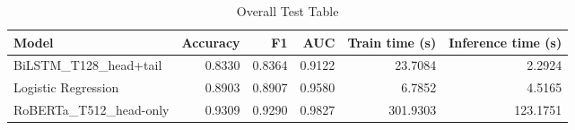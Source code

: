 \begin{table}
\caption{Overall Test Table}
\label{tab:overall_test_table}
\begin{tabular}{lrrrrr}
\toprule
Model & Accuracy & F1 & AUC & Train time (s) & Inference time (s) \\
\midrule
BiLSTM_T128_head+tail & 0.8330 & 0.8364 & 0.9122 & 23.7084 & 2.2924 \\
Logistic Regression & 0.8903 & 0.8907 & 0.9580 & 6.7852 & 4.5165 \\
RoBERTa_T512_head-only & 0.9309 & 0.9290 & 0.9827 & 301.9303 & 123.1751 \\
\bottomrule
\end{tabular}
\end{table}
